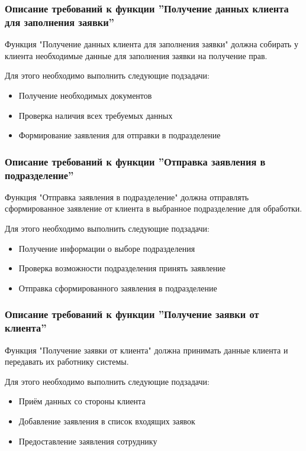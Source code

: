 \documentclass[russian, utf8, 12pt,pointsubsection,floatsubsection]{eskdtext}
\begin{document}
\subsubsection{Описание требований к функции ''Получение данных клиента для заполнения заявки''}
Функция "Получение данных клиента для заполнения заявки" должна собирать у клиента необходимые данные для заполнения заявки на получение прав.

Для этого необходимо выполнить следующие подзадачи:
\begin{itemize}
    \item Получение необходимых документов
    \item Проверка наличия всех требуемых данных
    \item Формирование заявления для отправки в подразделение
\end{itemize}

\subsubsection{Описание требований к функции ''Отправка заявления в подразделение''}
Функция "Отправка заявления в подразделение" должна отправлять сформированное заявление от клиента в выбранное подразделение для обработки.

Для этого необходимо выполнить следующие подзадачи:
\begin{itemize}
    \item Получение информации о выборе подразделения
    \item Проверка возможности подразделения принять заявление
    \item Отправка сформированного заявления в подразделение
\end{itemize}

\subsubsection{Описание требований к функции ''Получение заявки от клиента''}
Функция "Получение заявки от клиента" должна принимать данные клиента и передавать их работнику системы.

Для этого необходимо выполнить следующие подзадачи:
\begin{itemize}
    \item Приём данных со стороны клиента 
    \item Добавление заявления в список входящих заявок
    \item Предоставление заявления сотруднику
\end{itemize}
\end{document}
